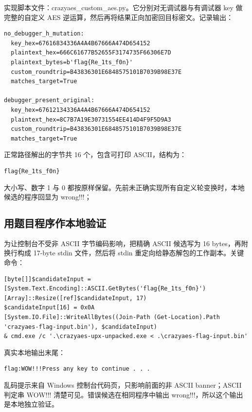 实现脚本文件：crazyaes\_custom\_aes.py。它分别对无调试器与有调试器 key 做完整的自定义 AES 逆运算，然后再将结果正向加密回目标密文。记录输出：

\begin{verbatim}
no_debugger_h_mutation:
  key_hex=67616834336A4A4B67666A474D654152
  plaintext_hex=666C61677B52655F3174735F66306E7D
  plaintext_bytes=b'flag{Re_1ts_f0n}'
  custom_roundtrip=B43836301E6848575101B7039B98E37E
  matches_target=True

debugger_present_original:
  key_hex=67612134336A4A4B67666A474D654152
  plaintext_hex=8C7B7A19E30731554EE414D4F9F5D9A3
  custom_roundtrip=B43836301E6848575101B7039B98E37E
  matches_target=True
\end{verbatim}

正常路径解出的字节共 16 个，包含可打印 ASCII，结构为：

\begin{verbatim}
flag{Re_1ts_f0n}
\end{verbatim}

大小写、数字 1 与 0 都按原样保留。先前未正确实现所有自定义轮变换时，本地候选的程序回显为 wrong!!!；

\subsection{用题目程序作本地验证}\label{ux7528ux9898ux76eeux7a0bux5e8fux4f5cux672cux5730ux9a8cux8bc1}

为让控制台不受非 ASCII 字节编码影响，把精确 ASCII 候选写为 16 bytes，再附换行构成 17-byte stdin 文件，然后将 stdin 重定向给静态解包的工作副本。关键命令：

\begin{verbatim}
[byte[]]$candidateInput = [System.Text.Encoding]::ASCII.GetBytes('flag{Re_1ts_f0n}')
[Array]::Resize([ref]$candidateInput, 17)
$candidateInput[16] = 0x0A
[System.IO.File]::WriteAllBytes((Join-Path (Get-Location).Path 'crazyaes-flag-input.bin'), $candidateInput)
& cmd.exe /c '.\crazyaes-upx-unpacked.exe < .\crazyaes-flag-input.bin'
\end{verbatim}

真实本地输出末尾：

\begin{verbatim}
flag:WOW!!!Press any key to continue . . .
\end{verbatim}

乱码提示来自 Windows 控制台代码页，只影响前面的非 ASCII banner；ASCII 判定串 WOW!!! 清楚可见。错误候选在相同程序中输出 wrong!!!，所以这个输出是本地独立验证。

